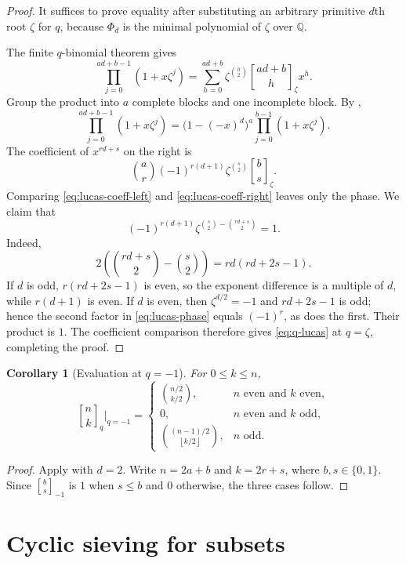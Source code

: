 \documentclass[11pt,oneside,openany]{book}
\newtheorem{corollary}[theorem]{Corollary}
\theoremstyle{definition}
\theoremstyle{remark}
\newcommand{\qbinom}[2]{\genfrac{[}{]}{0pt}{}{#1}{#2}_{q}}
\newcommand{\Qbinom}[3]{\genfrac{[}{]}{0pt}{}{#1}{#2}_{#3}}
\newcommand{\Q}{\mathbb Q}
\newcommand{\floor}[1]{\left\lfloor #1\right\rfloor}
\begin{document}
\begin{proof}
It suffices to prove equality after substituting an arbitrary primitive $d$th root $\zeta$ for $q$, because $\Phi_d$ is the minimal polynomial of $\zeta$ over $\Q$.

The finite $q$-binomial theorem gives
\[
 \prod_{j=0}^{ad+b-1}(1+x\zeta^j)
 =\sum_{h=0}^{ad+b}\zeta^{\binom h2}
   \Qbinom{ad+b}{h}{\zeta}x^h.
 \tag{16.5}\label{eq:lucas-coeff-left}
\]
Group the product into $a$ complete blocks and one incomplete block.  By ,
\[
 \prod_{j=0}^{ad+b-1}(1+x\zeta^j)
 =\bigl(1-(-x)^d\bigr)^a
   \prod_{j=0}^{b-1}(1+x\zeta^j).
\]
The coefficient of $x^{rd+s}$ on the right is
\[
 \binom ar(-1)^{r(d+1)}
 \zeta^{\binom s2}\Qbinom bs{\zeta}.
 \tag{16.6}\label{eq:lucas-coeff-right}
\]
Comparing \eqref{eq:lucas-coeff-left} and \eqref{eq:lucas-coeff-right} leaves only the phase.  We claim that
\[
 (-1)^{r(d+1)}
 \zeta^{\binom s2-\binom{rd+s}{2}}=1.
 \tag{16.7}\label{eq:lucas-phase}
\]
Indeed,
\[
 2\left(\binom{rd+s}{2}-\binom s2\right)
 =rd(rd+2s-1).
\]
If $d$ is odd, $r(rd+2s-1)$ is even, so the exponent difference is a multiple of $d$, while $r(d+1)$ is even.  If $d$ is even, then $\zeta^{d/2}=-1$ and $rd+2s-1$ is odd; hence the second factor in \eqref{eq:lucas-phase} equals $(-1)^r$, as does the first.  Their product is $1$.  The coefficient comparison therefore gives \eqref{eq:q-lucas} at $q=\zeta$, completing the proof.
\end{proof}

\begin{corollary}[Evaluation at $q=-1$]\label{cor:qminusone}
For $0\le k\le n$,
\[
 \qbinom nk\bigg|_{q=-1}
 =\begin{cases}
 \displaystyle\binom{n/2}{k/2},&n\text{ even and }k\text{ even},\\[7pt]
 0,&n\text{ even and }k\text{ odd},\\[7pt]
 \displaystyle\binom{(n-1)/2}{\floor{k/2}},&n\text{ odd}.
 \end{cases}
\]
\end{corollary}

\begin{proof}
Apply  with $d=2$.  Write $n=2a+b$ and $k=2r+s$, where $b,s\in\{0,1\}$.  Since $\Qbinom bs{-1}$ is $1$ when $s\le b$ and $0$ otherwise, the three cases follow.
\end{proof}

\section{Cyclic sieving for subsets}
\end{document}
